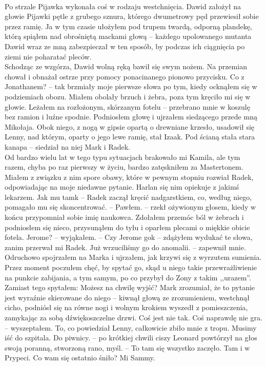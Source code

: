 \documentclass[../MAIN.tex]{subfiles}
\begin{document}
\\
Po strzale Pijawka wykonała coś w rodzaju westchnięcia.
Dawid założył na głowie Pijawki pętle z grubego sznura, którego dwumetrowy pęd przewiesił sobie przez ramię. Ja w tym czasie ułożyłem pod trupem twardą, odporną plandekę, którą spiąłem nad obrośniętą mackami głową -- każdego upolowanego mutanta Dawid wraz ze mną zabezpieczał w ten sposób, by podczas ich ciągnięcia po ziemi nie poharatać pleców.
\\
Schodząc ze wzgórza, Dawid wolną ręką bawił się swym nożem. Na przemian chował i obnażał ostrze przy pomocy ponacinanego pionowo przycisku.
\sx Co z Jonathanem? -- tak brzmiały moje pierwsze słowa po tym, kiedy ocknąłem się w podziemiach obozu.
\qd
Miałem obolały brzuch i żebra, poza tym kręciło mi się w głowie. Leżałem na rozłożonym, skórzanym fotelu -- przebrano mnie w koszulę bez ramion i luźne spodnie. Podniosłem głowę i ujrzałem siedzącego przede mną Mikołaja. Obok niego, z nogą w gipsie opartą o drewniane krzesło, usadowił się Lenny, nad którym, oparty o jego lewe ramię, stał Izaak. Pod ścianą stała stara kanapa -- siedział na niej Mark i Radek.
\\
Od bardzo wielu lat w tego typu sytuacjach brakowało mi Kamila, ale tym razem, chyba po raz pierwszy w życiu, bardzo zatęskniłem za Mastertonem. Miałem z związku z nim spore obawy, które w pewnym stopniu rozwiał Radek, odpowiadając na moje niedawne pytanie.
\sx Harlan się nim opiekuje z jakimś lekarzem. Jak mu tam\3k -- Radek zaczął kręcić nadgarstkiem, co, według niego, pomagało mu się skoncentrować. -- Pawłem. -- rzekł ożywionym głosem, kiedy w końcu przypomniał sobie imię naukowca.
\qd
Zdołałem przemóc ból w żebrach i podniosłem się nieco, przysunąłem do tyłu i oparłem plecami o miękkie obicie fotela. 
\sx Jerome? -- wyjąkałem. -- Czy Jerome go\3k -- zdążyłem wydukać te słowa, zanim przerwał mi Radek.
\xx Już wrzuciliśmy go do anomalii. -- zapewnił mnie. 
\qd
Odruchowo spojrzałem na Marka i ujrzałem, jak krzywi się z wyrzutem sumienia. Przez moment poczułem chęć, by spytać go, skąd u niego takie przewrażliwienie na punkcie zabijania, a tym samym, po co przybył do Zony z takim ,,urazem''. Zamiast tego spytałem:
\sx Możesz na chwilę wyjść?
\qd
Mark zrozumiał, że to pytanie jest wyraźnie skierowane do niego -- kiwnął głową ze zrozumieniem, westchnął cicho, podniósł się na równe nogi i wolnym krokiem wyszedł z pomieszczenia, zamykając za sobą dźwiękoszczelne drzwi.
\sx Coś jest nie tak. Coś naprawdę nie gra. -- wyszeptałem. To, co powiedział Lenny, całkowicie zbiło mnie z tropu.
\xx Musimy iść do szpitala. Do piwnicy. -- po krótkiej chwili ciszy Leonard powtórzył na głos swoją poranną, stworzoną rano, myśl. -- To tam się wszystko zaczęło. Tam i w Prypeci. Co wam się ostatnio śniło? Mi Sammy.
\end{document}
